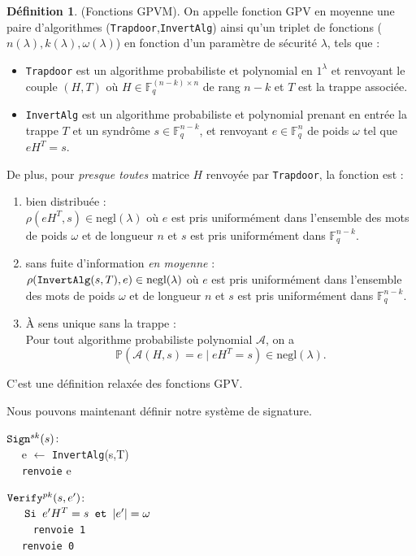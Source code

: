 \documentclass[12pt]{article}
\theoremstyle{definition}
\newtheorem{defi}[thm]{Définition}
\newcommand{\F}{\mathbb{F}}
\begin{document}
\begin{defi} (Fonctions GPVM). On appelle fonction GPV en moyenne une paire d'algorithmes (\verb|Trapdoor|,\verb|InvertAlg|) ainsi qu'un triplet de fonctions ($n(\lambda),k(\lambda),\omega(\lambda)$) en fonction d'un paramètre de sécurité $\lambda$, tels que :
\begin{itemize}
\item \verb|Trapdoor| est un algorithme probabiliste et polynomial en $1^\lambda$ et renvoyant le couple $(H,T)$ où $H \in \F_q^{(n-k) \times n}$ de rang $n-k$ et $T$ est la trappe associée.
\item \verb|InvertAlg| est un algorithme probabiliste et polynomial prenant en entrée la trappe $T$ et un syndrôme $s \in \F_q^{n-k}$, et renvoyant $e \in \F_q^{n}$ de poids $\omega$ tel que $eH^T = s$.
\end{itemize}
De plus, pour \textit{presque toutes} matrice $H$ renvoyée par \verb|Trapdoor|, la fonction est :
\begin{enumerate}
\item bien distribuée : \\
$\rho(eH^T,s) \in \text{negl}(\lambda)$ où $e$ est pris uniformément dans l'ensemble des mots de poids $\omega$ et de longueur $n$ et $s$ est pris uniformément dans $\F_q^{n-k}$. 
\item sans fuite d'information \textit{en moyenne} : \\
$ \rho(\verb|InvertAlg|(s,T),e) \in \text{negl}(\lambda)$ où $e$ est pris uniformément dans l'ensemble des mots de poids $\omega$ et de longueur $n$ et $s$ est pris uniformément dans $\F_q^{n-k}$. 
\item \`A sens unique sans la trappe : \\
Pour tout algorithme probabiliste polynomial $\mathcal{A}$, on a 
$$\mathbb{P}(\mathcal{A}(H,s) = e \;| \;eH^T = s) \in \text{negl}(\lambda).$$
\end{enumerate}
C'est une définition relaxée des fonctions GPV.
\end{defi}

Nous pouvons maintenant définir notre système de signature.
\begin{multicols}{2}
\begin{flushleft}
$\verb|Sign|^{sk}(s)$:\\
	$\quad$ e $\leftarrow$  \verb|InvertAlg|(s,T) \\
	$\quad$ \verb|renvoie| e
\end{flushleft}
\begin{flushleft}
$\verb|Verify|^{pk}(s,e')$: \\
	$\quad \verb| Si | e'H^T = s \verb| et | |e'| = \omega $ \\
	$\quad \quad$ \verb|renvoie 1| \\
	$\quad$ \verb|renvoie 0|
\end{flushleft}
\end{multicols}
\end{document}
